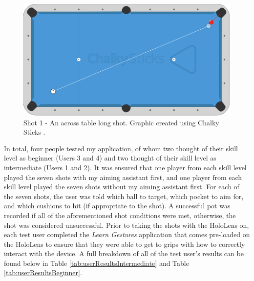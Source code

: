 \documentclass[ %
                author={Finn Alexander Wilkinson},
                supervisor={Dr. Andrew Calway},
                degree={MEng},
                title={\centering A Mixed Reality Aim Assistant for Pool and Snooker},
                subtitle={},
                type={Enterprise},
                year={2021} ]{dissertation}
\begin{document}
\begin{figure}[h!]
    \centering
    \includegraphics[scale = 0.15]{Images/Shot Diagrams/Shot_1.png}
    \caption{Shot 1 - An across table long shot. Graphic created using Chalky Sticks \cite{chalkySticks}.}
    \label{fig:evalShot1}
\end{figure}

In total, four people tested my application, of whom two thought of their skill level as beginner (Users 3 and 4) and two thought of their skill level as intermediate (Users 1 and 2). It was ensured that one player from each skill level played the seven shots with my aiming assistant first, and one player from each skill level played the seven shots without my aiming assistant first. For each of the seven shots, the user was told which ball to target, which pocket to aim for, and which cushions to hit (if appropriate to the shot). A successful pot was recorded if all of the aforementioned shot conditions were met, otherwise, the shot was considered unsuccessful. Prior to taking the shots with the HoloLens on, each test user completed the \textit{Learn Gestures} application that comes pre-loaded on the HoloLens\cite{learnGestures} to ensure that they were able to get to grips with how to correctly interact with the device. A full breakdown of all of the test user's results can be found below in Table \ref{tab:userResultsIntermediate} and Table \ref{tab:userResultsBeginner}. \\
\end{document}
